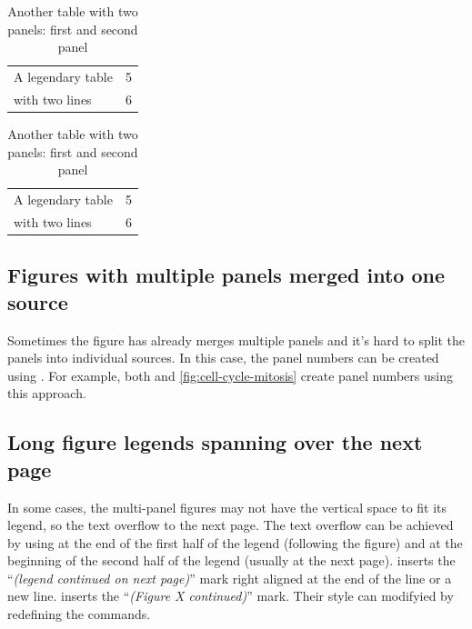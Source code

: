 \begin{table}[b]
    \centering
    \caption{Another table with two panels:  first and  second panel}
    \label{tab:subtable-demo}

    \begin{subtable}{0.5\linewidth}
        \centering
        \label{tab:subtab-a}
        \begin{tabular}{lc} \toprule
        A legendary table & 5 \\
        with two lines    & 6 \\ \bottomrule
        \end{tabular}
    \end{subtable}%
    \begin{subtable}{0.5\linewidth}
        \centering
        \label{tab:subtab-b}
        \begin{tabular}{lc} \toprule
        A legendary table & 5 \\
        with two lines    & 6 \\ \bottomrule
        \end{tabular}
    \end{subtable}
\end{table}


\subsection{Figures with multiple panels merged into one source}
Sometimes the figure has already merges multiple panels and it's hard to split the panels into individual sources.
In this case, the panel numbers can be created using .
For example, both  and \ref{fig:cell-cycle-mitosis} create panel numbers using this approach.


\subsection{Long figure legends spanning over the next page}
In some cases, the multi-panel figures may not have the vertical space to fit its legend, so the text overflow to the next page.
The text overflow can be achieved by using \cmd{\legendcontdnote} at the end of the first half of the legend (following the figure) and \cmd{\legendcontdref} at the beginning of the second half of the legend (usually at the next page).
\cmd{\legendcontdnote} inserts the ``\emph{(legend continued on next page)}'' mark right aligned at the end of the line or a new line.
\cmd{\legendcontdref} inserts the ``\emph{(Figure X continued)}'' mark.
Their style can modifyied by redefining the commands.

